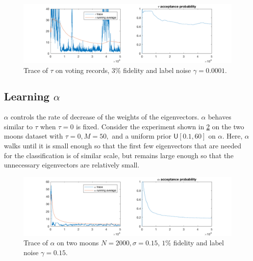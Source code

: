 \documentclass{siamart1116}
\begin{document}
        \begin{figure}[!htb]
        \centering
        \caption{\label{taM_tau_voting}Trace of $\tau$ on voting records, $3\%$ fidelity and label noise $\gamma = 0.0001$.}
        \includegraphics[width=0.8\linewidth]{tau_observations/voting.png}
        \end{figure}

    \subsection{Learning $\alpha$}
        $\alpha$ controls the rate of decrease of the weights of the eigenvectors. $\alpha$ behaves similar to $\tau$ when $\tau = 0$ is fixed. Consider the experiment shown in \cref{taM_alpha_moons} on the two moons dataset with $\tau = 0, M = 50,$ and a uniform prior $\mathsf{U}[0.1,60]$ on $\alpha$. Here, $\alpha$ walks until it is small enough so that the first few eigenvectors that are needed for the classification is of similar scale, but remains large enough so that the unnecessary eigenvectors are relatively small.

        \begin{figure}[!htb]
        \centering
        \caption{\label{taM_alpha_moons}Trace of $\alpha$ on two moons $N=2000, \sigma = 0.15$, $1\%$ fidelity and label noise $\gamma = 0.15$.}
        \includegraphics[width=0.8\linewidth]{alpha_observations/two_moons.png}
        \end{figure}
\end{document}
